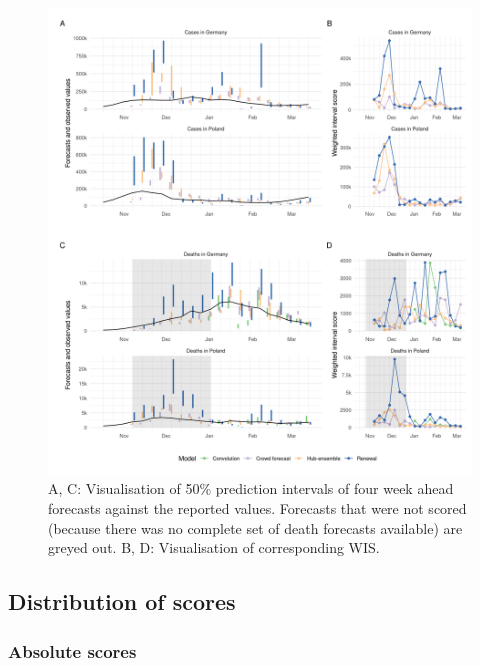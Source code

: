 \documentclass[
]{article}
\begin{document}
\begin{figure}[H]
\includegraphics[width=1\linewidth,]{../analysis/plots/figure-forecasts-4} \caption{A, C: Visualisation of 50\% prediction intervals of four week ahead forecasts against the reported values. Forecasts that were not scored (because there was no complete set of death forecasts available) are greyed out. B, D: Visualisation of corresponding WIS.}\label{fig:forecasts-and-truth-4}
\end{figure}

\clearpage

\hypertarget{distribution-of-scores}{%
\subsection{Distribution of scores}\label{distribution-of-scores}}

\hypertarget{absolute-scores}{%
\subsubsection{Absolute scores}\label{absolute-scores}}
\end{document}
